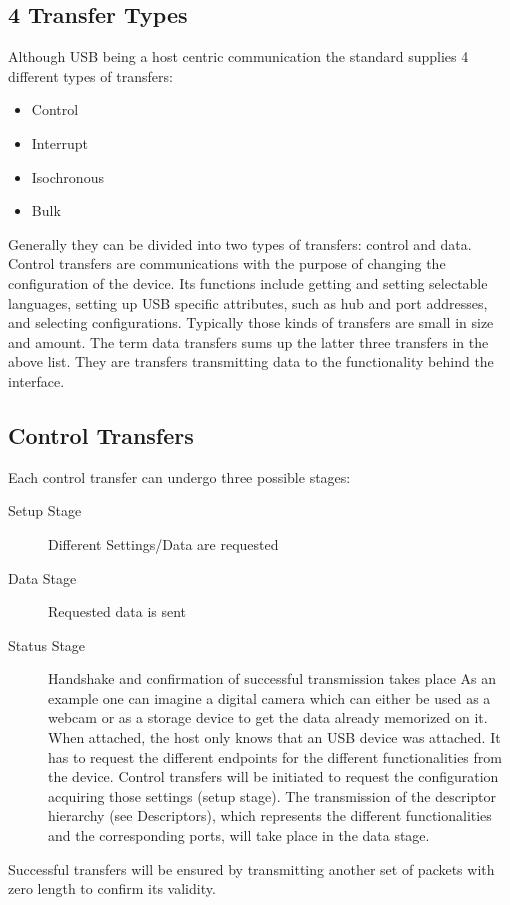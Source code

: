 \subsection{ 4 Transfer Types}
Although USB being a host centric communication the standard supplies 4 different types of transfers: 
\begin{itemize}
 \item Control
 \item Interrupt
 \item Isochronous
 \item Bulk
\end{itemize}

Generally they can be divided into two types of transfers: control and data. Control transfers are communications with the purpose of changing the 
configuration of the device. Its functions include getting and setting selectable languages, setting up USB specific attributes, such as hub and port 
addresses, and selecting configurations. Typically those kinds of transfers are small in size and amount. 
The term data transfers sums up the latter three transfers in the above list. They are transfers transmitting data to the functionality 
behind the interface. 

\subsection{Control Transfers}
Each control transfer can undergo three possible stages: 
\begin{description}
 \item[Setup Stage]Different Settings/Data are requested
 \item[Data Stage] Requested data is sent
 \item[Status Stage] Handshake and confirmation of successful transmission takes place
As an example one can imagine a digital camera which can either be used as a webcam or as a storage device to get the data already memorized on it.
When attached, the host only knows that an USB device was attached. It has to request the different endpoints for the different functionalities from 
the device. Control transfers will be initiated to request the configuration acquiring those settings (setup stage). The transmission of the
descriptor hierarchy (see Descriptors), which represents the different functionalities and the corresponding ports, will take place in the data 
stage.
\end{description}
Successful transfers will be ensured by transmitting another set of packets with zero length to confirm its validity.

